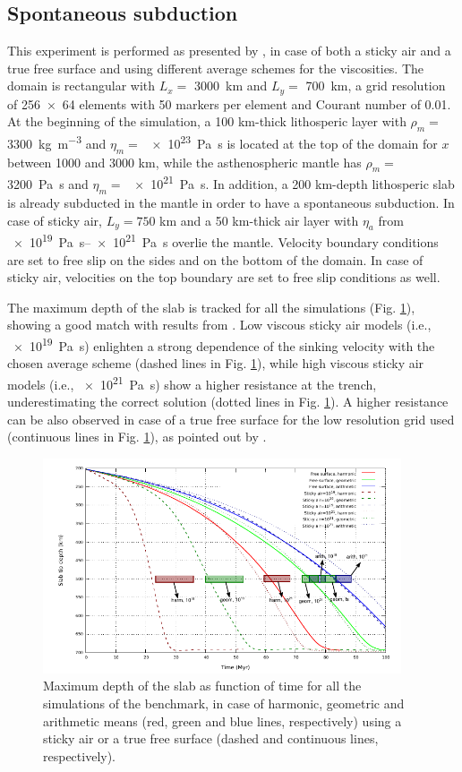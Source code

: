 \documentclass[hidelinks,11pt,a4paper]{article}
\begin{document}
\subsection{Spontaneous subduction}\label{sec:subduction}
This experiment is performed as presented by \citet{Schmeling2008}, in case of both a sticky air and a true free surface and using different average schemes for the viscosities. The domain is rectangular with $L_x=$ \SI{3000}{\km} and $L_y=$ \SI{700}{\km}, a grid resolution of \num{256x64} elements with 50 markers per element and Courant number of 0.01. At the beginning of the simulation, a 100 km-thick lithosperic layer with $\rho_m=$ \SI{3300}{\kg\per\cubic\metre} and $\eta_m=$ \SI{e23}{\pascal\s} is located at the top of the domain for $x$ between 1000 and 3000 km, while the asthenospheric mantle has $\rho_m=$ \SI{3200}{\pascal\s} and $\eta_m=$ \SI{e21}{\pascal\s}. In addition, a 200 km-depth lithosperic slab is already subducted in the mantle in order to have a spontaneous subduction. In case of sticky air, $L_y=750$ km and a 50 km-thick air layer with $\eta_a$ from \SIrange{e19}{e21}{\pascal\s} overlie the mantle. Velocity boundary conditions are set to free slip on the sides and on the bottom of the domain. In case of sticky air, velocities on the top boundary are set to free slip conditions as well.

The maximum depth of the slab is tracked for all the simulations (Fig. \ref{fig:subduction}), showing a good match with results from \citet{Schmeling2008}. Low viscous sticky air models (i.e., \SI{e19}{\pascal\s}) enlighten a strong dependence of the sinking velocity with the chosen average scheme (dashed lines in Fig. \ref{fig:subduction}), while high viscous sticky air models (i.e., \SI{e21}{\pascal\s}) show a higher resistance at the trench, underestimating the correct solution (dotted lines in Fig. \ref{fig:subduction}). A higher resistance can be also observed in case of a true free surface for the low resolution grid used (continuous lines in Fig. \ref{fig:subduction}), as pointed out by \citet{Schmeling2008}.

\begin{figure}
\centering
\noindent\includegraphics[width=400px]{./Figures/Subduction.pdf}
\caption{Maximum depth of the slab as function of time for all the simulations of the \citet{Schmeling2008} benchmark, in case of harmonic, geometric and arithmetic means (red, green and blue lines, respectively) using a sticky air or a true free surface (dashed and continuous lines, respectively).}
\label{fig:subduction}
\end{figure}
\end{document}
